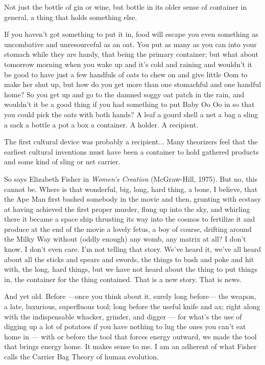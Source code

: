Not just the bottle of gin or wine, but bottle
in its older sense of container in general, a thing
that holds something else.

If you haven’t got something to put it in, food
will escape you even something as
uncombative and unresourceful as an oat. You
put as many as you can into your stomach while
they are handy, that being the primary container;
but what about tomorrow morning when you
wake up and it’s cold and raining and wouldn’t it
be good to have just a few handfuls of oats to
chew on and give little Oom to make her shut up,
but how do you get more than one stomachful
and one handful home? So you get up and go to
the damned soggy oat patch in the rain, and
wouldn’t it be a good thing if you had something
to put Baby Oo Oo in so that you could pick the
oats with both hands? A leaf a gourd shell a net a
bag a sling a sack a bottle a pot a box a container.
A holder. A recipient. 

\begin{displayquote}
    The first cultural device was probably a
    recipient... Many theorizers feel that the earliest
    cultural inventions must have been a container
    to hold gathered products and some kind of sling
    or net carrier.
\end{displayquote}

So says Elizabeth Fisher in \textit{Women’s
Creation} (McGraw-Hill, 1975). But no, this
cannot be. Where is that wonderful, big, long,
hard thing, a bone, I believe, that the Ape Man
first bashed somebody in the movie and then,
grunting with ecstasy at having achieved the first
proper murder, flung up into the sky, and
whirling there it became a space ship thrusting its
way into the cosmos to fertilize it and produce at
the end of the movie a lovely fetus, a boy of
course, drifting around the Milky Way without
(oddly enough) any womb, any matrix at all? I
don’t know. I don’t even care. I’m not telling that
story. We’ve heard it, we’ve all heard about all
the sticks and spears and swords, the things to
bash and poke and hit with, the long, hard things,
but we have not heard about the thing to put
things in, the container for the thing contained.
That is a new story. That is news.

And yet old. Before ---once you think about
it, surely long before--- the weapon, a late,
luxurious, superfluous tool; long before the
useful knife and ax; right along with the
indispensable whacker, grinder, and digger --- for
what’s the use of digging up a lot of potatoes if
you have nothing to lug the ones you can’t eat
home in --- with or before the tool that forces
energy outward, we made the tool that brings
energy home. It makes sense to me. I am an
adherent of what Fisher calls the Carrier Bag
Theory of human evolution.

